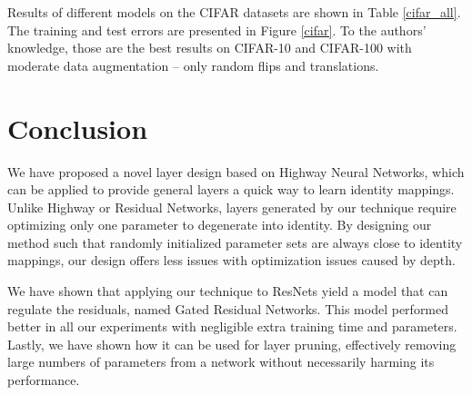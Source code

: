 \documentclass{article} \RequirePackage{amsmath,amsthm,amsfonts,amssymb}
\begin{document}
Results of different models on the CIFAR datasets are shown in Table \ref{cifar_all}. The training and test errors are presented in Figure \ref{cifar}. To the authors' knowledge, those are the best results on CIFAR-10 and CIFAR-100 with moderate data augmentation -- only random flips and translations.


















\section{Conclusion}

We have proposed a novel layer design based on Highway Neural Networks, which can be applied to provide general layers a quick way to learn identity mappings. Unlike Highway or Residual Networks, layers generated by our technique require optimizing only one parameter to degenerate into identity. By designing our method such that randomly initialized parameter sets are always close to identity mappings, our design offers less issues with optimization issues caused by depth.

We have shown that applying our technique to ResNets yield a model that can regulate the residuals, named Gated Residual Networks. This model performed better in all our experiments with negligible extra training time and parameters. Lastly, we have shown how it can be used for layer pruning, effectively removing large numbers of parameters from a network without necessarily harming its performance.









\end{document}
